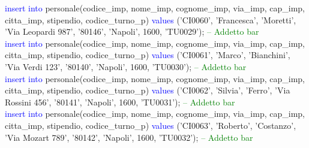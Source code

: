 \documentclass{article}
\begin{document}
\begin{flushleft}
{        \vspace{2mm}
        \hspace*{0.5em}\textcolor{blue}{insert into} personale(codice\_imp, nome\_imp, cognome\_imp, via\_imp, cap\_imp, \hspace*{0.5em}citta\_imp, stipendio, codice\_turno\_p) \textcolor{blue}{values} ('CI0060', 'Francesca', 'Moretti', \hspace*{0.5em}'Via Leopardi \hspace*{0.5em}987', '80146', 'Napoli', 1600, 'TU0029'); \hspace*{0.5em} \textcolor{green}{-- Addetto bar} \\
        \vspace{2mm}
        \hspace*{0.5em}\textcolor{blue}{insert into} personale(codice\_imp, nome\_imp, cognome\_imp, via\_imp, cap\_imp, \hspace*{0.5em}citta\_imp, stipendio, codice\_turno\_p) \textcolor{blue}{values} ('CI0061', 'Marco', 'Bianchini', \hspace*{0.5em}'Via Verdi 123', \hspace*{0.5em}'80140', 'Napoli', 1600, 'TU0030'); \hspace*{0.5em} \textcolor{green}{-- Addetto bar} \\
        \vspace{2mm}
        \hspace*{0.5em}\textcolor{blue}{insert into} personale(codice\_imp, nome\_imp, cognome\_imp, via\_imp, cap\_imp, \hspace*{0.5em}citta\_imp, stipendio, codice\_turno\_p) \textcolor{blue}{values} ('CI0062', 'Silvia', 'Ferro', 'Via \hspace*{0.5em}Rossini 456', \hspace*{0.5em}'80141', 'Napoli', 1600, 'TU0031'); \hspace*{0.5em} \textcolor{green}{-- Addetto bar} \\
        \vspace{2mm}
        \hspace*{0.5em}\textcolor{blue}{insert into} personale(codice\_imp, nome\_imp, cognome\_imp, via\_imp, cap\_imp, \hspace*{0.5em}citta\_imp, stipendio, codice\_turno\_p) \textcolor{blue}{values} ('CI0063', 'Roberto', 'Costanzo', \hspace*{0.5em}'Via Mozart 789', \hspace*{0.5em}'80142', 'Napoli', 1600, 'TU0032'); \hspace*{0.5em} \textcolor{green}{-- Addetto bar} \\
}
\end{flushleft}
\end{document}
